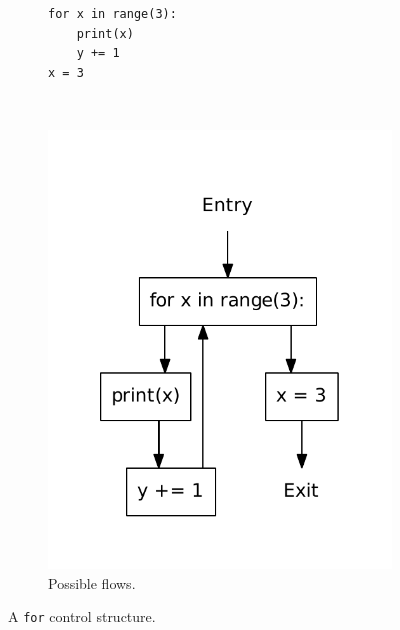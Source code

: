\begin{figure}
  \centering
  \begin{subfigure}[b]{0.4\textwidth}
    \begin{lstlisting}[style=python, caption={Code example.}, label={python:for:code}]
for x in range(3):
    print(x)
    y += 1
x = 3
    \end{lstlisting}
  \end{subfigure}
  ~ %
  \begin{subfigure}[b]{0.4\textwidth}
    \centering
    \includegraphics[scale=.5]{./figures/for.pdf}
    \caption{Possible flows.}
    \label{python:for:flow}
  \end{subfigure}
  \caption{A \texttt{for} control structure.}
  \label{python:for}
\end{figure}


